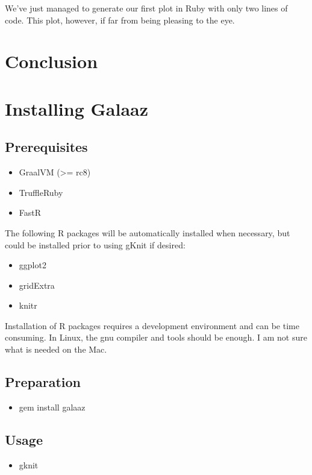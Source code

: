 \documentclass[]{article}
\providecommand{\tightlist}{%
  \setlength{\itemsep}{0pt}\setlength{\parskip}{0pt}}
\begin{document}
We've just managed to generate our first plot in Ruby with only two
lines of code. This plot, however, if far from being pleasing to the
eye.

\section{Conclusion}\label{conclusion}

\section{Installing Galaaz}\label{installing-galaaz}

\subsection{Prerequisites}\label{prerequisites}

\begin{itemize}
\tightlist
\item
  GraalVM (\textgreater{}= rc8)
\item
  TruffleRuby
\item
  FastR
\end{itemize}

The following R packages will be automatically installed when necessary,
but could be installed prior to using gKnit if desired:

\begin{itemize}
\tightlist
\item
  ggplot2
\item
  gridExtra
\item
  knitr
\end{itemize}

Installation of R packages requires a development environment and can be
time consuming. In Linux, the gnu compiler and tools should be enough. I
am not sure what is needed on the Mac.

\subsection{Preparation}\label{preparation}

\begin{itemize}
\tightlist
\item
  gem install galaaz
\end{itemize}

\subsection{Usage}\label{usage}

\begin{itemize}
\tightlist
\item
  gknit 
\end{itemize}
\end{document}
